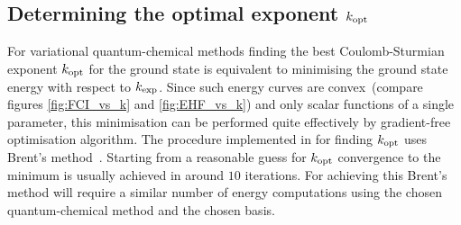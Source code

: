 %


%
%


%
%
\subsection{Determining the optimal exponent $k_\text{opt}$}
\label{sec:DetermineKopt}
For variational quantum-chemical methods finding the best Coulomb-Sturmian
exponent $k_\text{opt}$ for the ground state is equivalent to minimising the ground state
energy with respect to $k_\text{exp}$.
Since such energy curves are
convex~(compare figures \ref{fig:FCI_vs_k} and \ref{fig:EHF_vs_k})
and only scalar functions of a single parameter,
this minimisation can be performed quite effectively
by gradient-free optimisation algorithm.
The procedure implemented in \molsturm for finding $k_\text{opt}$
uses Brent's method~\cite{Brent1972}.
Starting from a reasonable guess for $k_\text{opt}$ convergence to the minimum
is usually achieved in around $10$ iterations.
For achieving this Brent's method will require a similar number of
energy computations using the chosen quantum-chemical method
and the chosen \CS basis.

